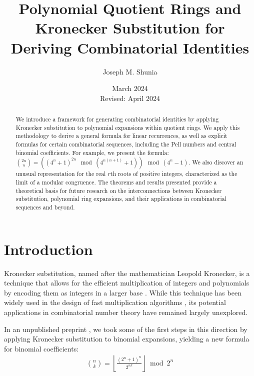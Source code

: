 \documentclass[11pt,reqno]{article}
\theoremstyle{plain}
\theoremstyle{definition}
\newcommand{\floor}[1]{\left\lfloor #1 \right\rfloor}
\begin{document}
\title{Polynomial Quotient Rings and Kronecker Substitution for Deriving Combinatorial Identities}
\author{Joseph M. Shunia}
\date{March 2024 \\ \small Revised: April 2024 \normalsize}

\maketitle

\begin{abstract}
We introduce a framework for generating combinatorial identities by applying Kronecker substitution to polynomial expansions within quotient rings. We apply this methodology to derive a general formula for linear recurrences, as well as explicit formulas for certain combinatorial sequences, including the Pell numbers and central binomial coefficients. For example, we present the formula: $\binom{2n}{n} = \left((4^n + 1)^{2n} \mod (4^{n(n+1)} + 1)\right) \mod (4^n-1)$. We also discover an unusual representation for the real $r$th roots of positive integers, characterized as the limit of a modular congruence. The theorems and results presented provide a theoretical basis for future research on the interconnections between Kronecker substitution, polynomial ring expansions, and their applications in combinatorial sequences and beyond.
\end{abstract}

\section{Introduction}
Kronecker substitution, named after the mathematician Leopold Kronecker, is a technique that allows for the efficient multiplication of integers and polynomials by encoding them as integers in a larger base \cite{kronecker1882}. While this technique has been widely used in the design of fast multiplication algorithms \cite{harvey2009kronecker, harvey2014faster, albrecht2018implementing, bos2020postquantum, greuet2022modular}, its potential applications in combinatorial number theory have remained largely unexplored.

In an unpublished preprint \cite{shunia2023simple}, we took some of the first steps in this direction by applying Kronecker substitution to binomial expansions, yielding a new formula for binomial coefficients:
\begin{align*}
    \binom{n}{k} = \floor{\frac{(2^n+1)^n}{2^{n k}}} \bmod{2^n}
\end{align*}
\end{document}
